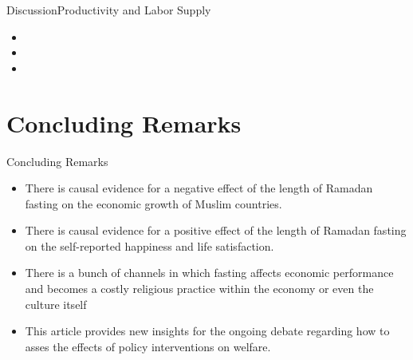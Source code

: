 \documentclass[pdftex,12pt,xcolor=pdftex,table]{beamer}
\begin{document}
    \begin{frame}{Discussion}{Productivity and Labor Supply}
    \begin{itemize}
        \item {}
        \item {}
        \item {}
        
        \vspace{0.5cm}
    \end{itemize}
    \end{frame}
    

\section{Concluding Remarks}
    \begin{frame}{Concluding Remarks}
    
    \begin{itemize}
        \item<1-> There is causal evidence for a negative effect of the length of Ramadan fasting on the economic growth of Muslim countries.
        \item<2-> There is causal evidence for a positive effect of the length of Ramadan fasting on the self-reported happiness and life satisfaction.
        \item<3-> There is a bunch of channels in which fasting affects economic performance and becomes a costly religious practice within the economy or even the culture itself
        \item<4> This article provides new insights for the ongoing debate regarding how to asses the effects of policy interventions on welfare.
    \end{itemize}
        
    \end{frame}
    
\end{document}
